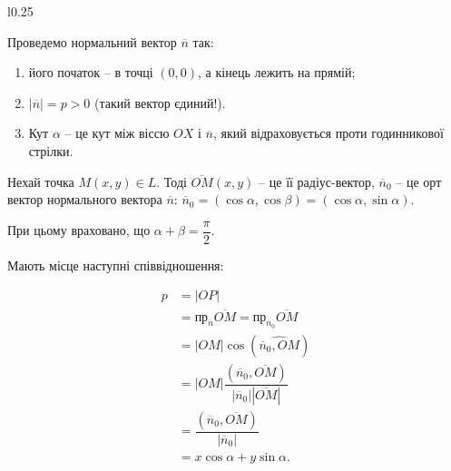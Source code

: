    \begin{wrapfigure}{l}{0.25\textwidth}
        \centering
        \label{fig:alg:norm-equatation-of-the-line}
    \end{wrapfigure}
 
    
    Проведемо нормальний вектор $\overline{n}$ так:
    \begin{enumerate}
        \item його початок -- в точці $(0,0)$, а кінець лежить на прямій;
        \item $|\overline{n}| = p>0$ (такий вектор єдиний!).
        \item Кут $\alpha$ -- це кут між віссю $OX$ і $\overline{n}$, який відраховується проти годинникової стрілки.
    \end{enumerate}
    
    Нехай точка $M(x,y) \in L$. Тоді $\overline{OM}(x,y)$ -- це її радіус-вектор, $\overline{n}_0$ -- це орт вектор
    нормального вектора $\overline{n}$: $\overline{n}_0 = (\cos\alpha,\cos\beta) = (\cos\alpha,\sin\alpha)$.
    
    При цьому враховано, що $\alpha + \beta = \dfrac{\pi}{2}$.
    
    Мають місце наступні співвідношення:

    \begin{equation*}
        \begin{split}
            p
            &= |OP|\\
            &= \text{пр}_{\overline{n}}\overline{OM} = \text{пр}_{\overline{n}_0}\overline{OM}\\
            &= |OM|\cos(\widehat{\overline{n}_0,OM})\\
            &= |OM|\dfrac{(\overline{n}_0,\overline{OM})}{|\overline{n}_0||\overline{OM}|}\\
            &= \dfrac{(\overline{n}_0,\overline{OM})}{|\overline{n}_0|}\\
            &= x\cos\alpha + y\sin\alpha.\\
        \end{split}
    \end{equation*}
    
